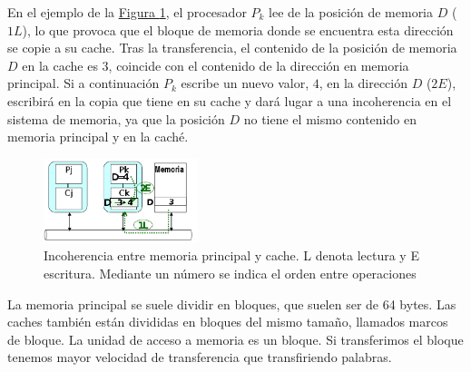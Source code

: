\documentclass[10pt,a4paper,spanish]{report}
\begin{document}
En el ejemplo de la \hyperref[ejemplo_coherencia]{Figura \ref*{ejemplo_coherencia}}, el procesador $P_k$ lee de la posición de memoria $D$ ($1L$), lo que provoca que el bloque de memoria donde se encuentra esta dirección se copie a su cache. Tras la transferencia, el contenido de la posición de memoria $D$ en la cache es $3$, coincide con el contenido de la dirección en memoria principal. Si a continuación $P_k$ escribe un nuevo valor, $4$, en la dirección $D$ ($2E$), escribirá en la copia que tiene en su cache y dará lugar a una incoherencia en el sistema de memoria, ya que la posición $D$ no tiene el mismo contenido en memoria principal y en la caché.

\begin{figure}[!h]
\centering
\includegraphics[width=0.4\textwidth]{68}
\caption{Incoherencia entre memoria principal y cache. L denota lectura y E escritura. Mediante un número se indica el orden entre operaciones}
\label{ejemplo_coherencia}
\end{figure}

La memoria principal se suele dividir en bloques, que suelen ser de 64 bytes. Las caches también están divididas en bloques del mismo tamaño, llamados marcos de bloque. La unidad de acceso a memoria es un bloque. Si transferimos el bloque tenemos mayor velocidad de transferencia que transfiriendo palabras.
\end{document}
